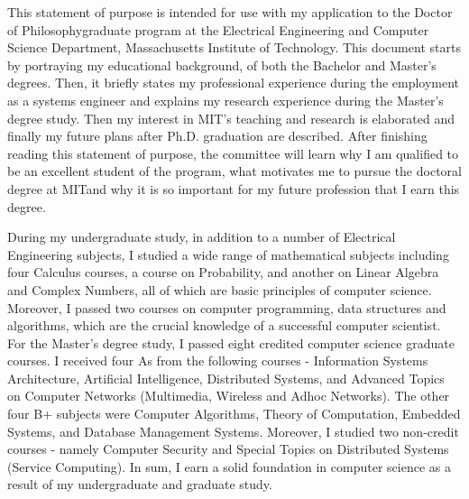 \documentclass[a4paper,10pt]{report}
\newcommand{\university}{Massachusetts Institute of Technology}
\newcommand{\department}{Electrical Engineering and Computer Science Department}
\newcommand{\uniabbre}{MIT}
\newcommand{\degree}{Doctor of Philosophy}
\begin{document}

\vspace{0.4cm}
This statement of purpose is intended for use with my application to the \degree \space graduate program at the \department, \university. This document starts by portraying my educational background, of both the Bachelor and Master's degrees. Then, it briefly states my professional experience during the employment as a systems engineer and explains my research experience during the Master's degree study. Then my interest in \uniabbre's teaching and research is elaborated and finally my future plans after Ph.D. graduation are described. After finishing reading this statement of purpose, the committee will learn why I am qualified to be an excellent student of the program, what motivates me to pursue the doctoral degree at \uniabbre \space and why it is so important for my future profession that I earn this degree.

\vspace{0.2cm}
During my undergraduate study, in addition to a number of Electrical Engineering subjects, I studied a wide range of mathematical subjects including four Calculus courses, a course on Probability, and another on Linear Algebra and Complex Numbers, all of which are basic principles of computer science. Moreover, I passed two courses on computer programming, data structures and algorithms, which are the crucial knowledge of a successful computer scientist. For the Master's degree study, I passed eight credited computer science graduate courses. I received four As from the following courses - Information Systems Architecture, Artificial Intelligence, Distributed Systems, and Advanced Topics on Computer Networks (Multimedia, Wireless and Adhoc Networks). The other four B+ subjects were Computer Algorithms, Theory of Computation, Embedded Systems, and Database Management Systems. Moreover, I studied two non-credit courses - namely Computer Security and Special Topics on Distributed Systems (Service Computing). In sum, I earn a solid foundation in computer science as a result of my undergraduate and graduate study. 
\end{document}
